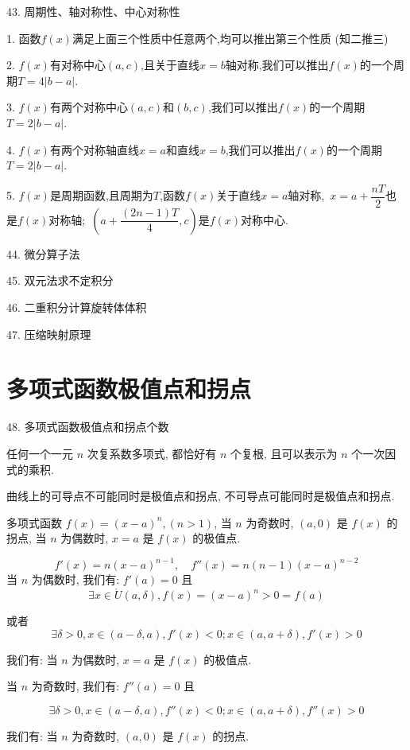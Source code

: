 43. 周期性、轴对称性、中心对称性
\begin{theorem}
	1. 函数$f(x)$满足上面三个性质中任意两个,均可以推出第三个性质 (知二推三)
	
	2. $f(x)$有对称中心$(a,c)$,且关于直线$x=b$轴对称,我们可以推出$f(x)$的一个周期$T=4|b-a|$.
	
	3. $f(x)$有两个对称中心$(a,c)$和$(b,c)$,我们可以推出$f(x)$的一个周期$T=2|b-a|$.
	
	4. $f(x)$有两个对称轴直线$x=a$和直线$x=b$,我们可以推出$f(x)$的一个周期$T=2|b-a|$.
	
	5. $f(x)$是周期函数,且周期为$T$,函数$f(x)$关于直线$x=a$轴对称,\ $x=a+\dfrac{nT}{2}$也是$f(x)$对称轴;\ $(a+\dfrac{(2n-1)T}{4},c)$是$f(x)$对称中心.
\end{theorem}

44. 微分算子法

45. 双元法求不定积分

46. 二重积分计算旋转体体积

47. 压缩映射原理

\section{多项式函数极值点和拐点}
48. 多项式函数极值点和拐点个数

\begin{theorem}[代数基本定理]\label{the: 代数基本定理}
	任何一个一元 $n$ 次复系数多项式, 都恰好有 $n$ 个复根, 且可以表示为 $n$ 个一次因式的乘积.
\end{theorem}

\begin{corollary}[曲线的极值点和拐点]
	曲线上的可导点不可能同时是极值点和拐点, 不可导点可能同时是极值点和拐点.
\end{corollary}

\begin{proposition}\label{pro: 命题一}
	多项式函数 $f(x) = (x-a)^{n},(n>1)$, 当 $n$ 为奇数时, $(a,0)$ 是 $f(x)$ 的拐点, 当 $n$ 为偶数时, $x=a$ 是 $f(x)$ 的极值点.
\end{proposition}
\begin{anymark}[证明]

	$$f'(x) = n(x-a)^{n-1},\quad f''(x) = n(n-1)(x-a)^{n-2}$$
	当 $n$ 为偶数时, 我们有: $f'(a) = 0$ 且 
	$$\exists x\in \mathring{U}(a,\delta), f(x) = (x-a)^{n} > 0 = f(a)$$

	或者 
	$$\exists \delta > 0, x\in (a-\delta,a),f'(x)<0; x\in (a,a+\delta),f'(x)>0$$
	
	我们有: 当 $n$ 为偶数时, $x=a$ 是 $f(x)$ 的极值点.
	
	当 $n$ 为奇数时, 我们有: $f''(a) = 0$ 且
	
	$$\exists \delta > 0, x\in (a-\delta,a),f''(x)<0; x\in (a,a+\delta),f''(x)>0$$

	我们有: 当 $n$ 为奇数时, $(a,0)$ 是 $f(x)$ 的拐点.
	

\end{anymark}


